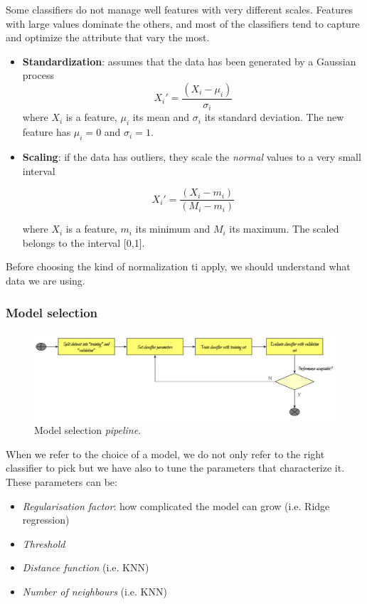 Some classifiers do not manage well features with very different scales. Features with large values dominate the others, and most of the classifiers tend to capture and optimize the attribute that vary the most.

\begin{itemize}
\item \textbf{Standardization}: assumes that the data has been generated by a Gaussian process 
$$X_i' = \frac{(X_i - \mu_i)}{\sigma_i}$$
where $X_i$ is a feature, $\mu_i$ its mean and $\sigma_i$ its standard deviation. The new feature has $\mu_i = 0$ and $\sigma_i = 1$.

\item \textbf{Scaling}: if the data has outliers, they scale the \emph{normal} values to a very small interval

$$X_i' = \frac{(X_i - m_i)}{(M_i - m_i)}$$

where $X_i$ is a feature, $m_i$ its minimum and $M_i$ its maximum. The scaled belongs to the interval [0,1].

\end{itemize}

Before choosing the kind of normalization ti apply, we should understand what data we are using.

\subsubsection{Model selection}

\begin{figure}[H]%
 \centering
 \includegraphics[width=13cm]{./img/08/model_selection}
 \caption{\label{pic:model_selection} Model selection \emph{pipeline}.}
\end{figure}

When we refer to the choice of a model, we do not only refer to the right classifier to pick but we have also to tune the parameters that characterize it. These parameters can be:
\begin{itemize}
\item \emph{Regularisation factor}: how complicated the model can grow (i.e. Ridge regression)
\item \emph{Threshold} 
\item \emph{Distance function} (i.e. KNN)
\item \emph{Number of neighbours} (i.e. KNN)
\end{itemize}

